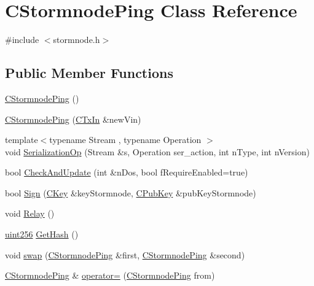 \hypertarget{class_c_stormnode_ping}{}\section{C\+Stormnode\+Ping Class Reference}
\label{class_c_stormnode_ping}


{\ttfamily \#include $<$stormnode.\+h$>$}

\subsection*{Public Member Functions}
\begin{DoxyCompactItemize}
\item 
\hyperlink{class_c_stormnode_ping_a68d6a920cf9edf6abdd95daf7001c309}{C\+Stormnode\+Ping} ()
\item 
\hyperlink{class_c_stormnode_ping_a6c1ab32c3bb00188b9328e3b923198df}{C\+Stormnode\+Ping} (\hyperlink{class_c_tx_in}{C\+Tx\+In} \&new\+Vin)
\item 
{\footnotesize template$<$typename Stream , typename Operation $>$ }\\void \hyperlink{class_c_stormnode_ping_ab41f768e659b72da337e2f28d226c286}{Serialization\+Op} (Stream \&s, Operation ser\+\_\+action, int n\+Type, int n\+Version)
\item 
bool \hyperlink{class_c_stormnode_ping_af77ba52e9ff7531d09b61fefa372efa4}{Check\+And\+Update} (int \&n\+Dos, bool f\+Require\+Enabled=true)
\item 
bool \hyperlink{class_c_stormnode_ping_a7552ace33ea9f797431ada062ab0e2e8}{Sign} (\hyperlink{class_c_key}{C\+Key} \&key\+Stormnode, \hyperlink{class_c_pub_key}{C\+Pub\+Key} \&pub\+Key\+Stormnode)
\item 
void \hyperlink{class_c_stormnode_ping_a1f9010915780b43dffae9965531a951a}{Relay} ()
\item 
\hyperlink{classuint256}{uint256} \hyperlink{class_c_stormnode_ping_a3e2dbb87bd2fd09f87d6306606a48acb}{Get\+Hash} ()
\item 
void \hyperlink{class_c_stormnode_ping_a6d5cdf09bf1f0fef6d02e1efc3557ce1}{swap} (\hyperlink{class_c_stormnode_ping}{C\+Stormnode\+Ping} \&first, \hyperlink{class_c_stormnode_ping}{C\+Stormnode\+Ping} \&second)
\item 
\hyperlink{class_c_stormnode_ping}{C\+Stormnode\+Ping} \& \hyperlink{class_c_stormnode_ping_ac6dbda886713de4642d10872595f19c7}{operator=} (\hyperlink{class_c_stormnode_ping}{C\+Stormnode\+Ping} from)
\end{DoxyCompactItemize}
